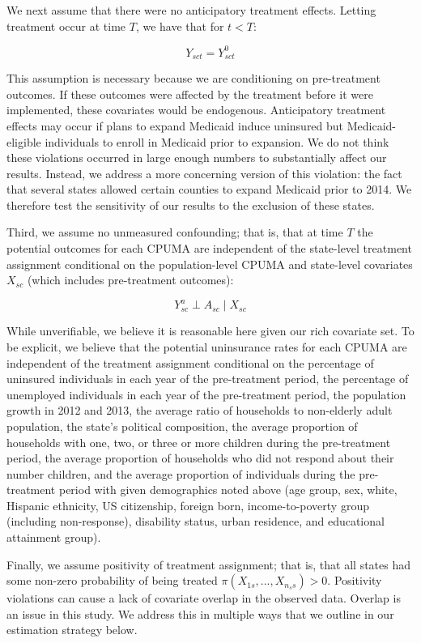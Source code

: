 \documentclass[12pt]{article}
\begin{document}
We next assume that there were no anticipatory treatment effects. Letting treatment occur at time $T$, we have that for $t < T$:

$$
Y_{sct} = Y_{sct}^0
$$

This assumption is necessary because we are conditioning on pre-treatment outcomes. If these outcomes were affected by the treatment before it were implemented, these covariates would be endogenous. Anticipatory treatment effects may occur if plans to expand Medicaid induce uninsured but Medicaid-eligible individuals to enroll in Medicaid prior to expansion. We do not think these violations occurred in large enough numbers to substantially affect our results. Instead, we address a more concerning version of this violation: the fact that several states allowed certain counties to expand Medicaid prior to 2014. We therefore test the sensitivity of our results to the exclusion of these states.

Third, we assume no unmeasured confounding; that is, that at time $T$ the potential outcomes for each CPUMA are independent of the state-level treatment assignment conditional on the population-level CPUMA and state-level covariates $X_{sc}$ (which includes pre-treatment outcomes):

$$
Y_{sc}^a \perp A_{sc} \mid X_{sc}
$$

While unverifiable, we believe it is reasonable here given our rich covariate set. To be explicit, we believe that the potential uninsurance rates for each CPUMA are independent of the treatment assignment conditional on the percentage of uninsured individuals in each year of the pre-treatment period, the percentage of unemployed individuals in each year of the pre-treatment period, the population growth in 2012 and 2013, the average ratio of households to non-elderly adult population, the state's political composition, the average proportion of households with one, two, or three or more children during the pre-treatment period, the average proportion of households who did not respond about their number children, and the average proportion of individuals during the pre-treatment period with given demographics noted above (age group, sex, white, Hispanic ethnicity, US citizenship, foreign born, income-to-poverty group (including non-response), disability status, urban residence, and educational attainment group). 

Finally, we assume positivity of treatment assignment; that is, that all states had some non-zero probability of being treated $\pi(X_{1s}, ..., X_{n_ss}) > 0$. Positivity violations can cause a lack of covariate overlap in the observed data. Overlap is an issue in this study. We address this in multiple ways that we outline in our estimation strategy below. 
\end{document}
